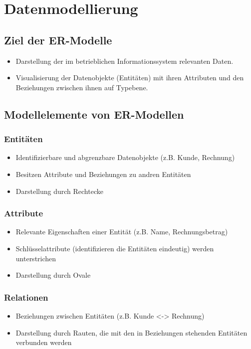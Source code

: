 \section{Datenmodellierung}

\subsection{Ziel der ER-Modelle}
    \begin{itemize}
        \item Darstellung der im betrieblichen Informationssystem relevanten Daten.
        \item Visualisierung der Datenobjekte (Entitäten) mit ihren Attributen und den Beziehungen zwischen ihnen auf Typebene.
    \end{itemize}

\subsection{Modellelemente von ER-Modellen}
    \subsubsection*{Entitäten}
        \begin{itemize}
            \item Identifizierbare und abgrenzbare Datenobjekte (z.B. Kunde, Rechnung)
            \item Besitzen Attribute und Beziehungen zu andren Entitäten
            \item Darstellung durch Rechtecke
        \end{itemize}
    \subsubsection*{Attribute}
        \begin{itemize}
            \item Relevante Eigenschaften einer Entität (z.B. Name, Rechnungsbetrag)
            \item Schlüsselattribute (identifizieren die Entitäten eindeutig) werden unterstrichen
            \item Darstellung durch Ovale
        \end{itemize}
    \subsubsection*{Relationen}
        \begin{itemize}
            \item Beziehungen zwischen Entitäten (z.B. Kunde <-> Rechnung)
            \item Darstellung durch Rauten, die mit den in Beziehungen stehenden Entitäten verbunden werden
        \end{itemize}

